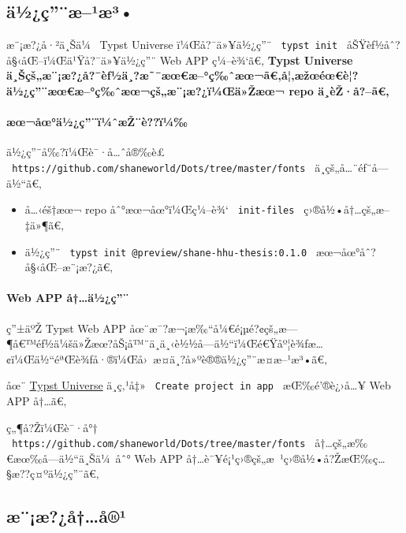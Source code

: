 
\subsection{ä½¿ç''¨æ--¹æ³•}\label{uxe4uxbduxe7uxe6uxb9uxe6uxb3}

æ¨¡æ?¿å·²ä¸Šä¼~ Typst Universe ï¼Œå?¯ä»¥ä½¿ç''¨ \texttt{\ typst\ init\ }
åŠŸèƒ½åˆ?å§‹åŒ--ï¼Œä¹Ÿå?¯ä»¥ä½¿ç''¨ Web APP ç¼--è¾`ã€‚ \textbf{Typst
Universe
ä¸Šçš„æ¨¡æ?¿å?¯èƒ½ä¸?æ˜¯æœ€æ--°ç‰ˆæœ¬ã€‚å¦‚æžœéœ€è¦?ä½¿ç''¨æœ€æ--°ç‰ˆæœ¬çš„æ¨¡æ?¿ï¼Œä»Žæœ¬
repo ä¸­èŽ·å?--ã€‚}

\paragraph{æœ¬åœ°ä½¿ç''¨ï¼ˆæŽ¨è??ï¼‰}\label{uxe6ux153uxe5ux153uxe4uxbduxe7uxefuxbcux2c6uxe6ux17euxe8uxefuxbc}

ä½¿ç''¨å‰?ï¼Œè¯·å\ldots ˆå®‰è£
\texttt{\ https://github.com/shaneworld/Dots/tree/master/fonts\ }
ä¸­çš„å\ldots¨éƒ¨å­---ä½``ã€‚

\begin{itemize}
\item
  å\ldots‹éš†æœ¬ repo åˆ°æœ¬åœ°ï¼Œç¼--è¾` \texttt{\ init-files\ }
  ç›®å½•å†\ldots çš„æ--‡ä»¶ã€‚
\item
  ä½¿ç''¨ \texttt{\ typst\ init\ @preview/shane-hhu-thesis:0.1.0\ }
  æœ¬åœ°åˆ?å§‹åŒ--æ¨¡æ?¿ã€‚
\end{itemize}

\paragraph{Web APP å†\ldots ä½¿ç''¨}\label{web-app-uxe5uxe4uxbduxe7}

ç''±äºŽ Typst Web APP
åœ¨æ¯?æ¬¡æ‰``å¼€é¡µé?¢çš„æ---¶å€™éƒ½ä¼šä»Žæœ?åŠ¡å™¨ä¸­ä¸‹è½½å­---ä½``ï¼Œé€Ÿåº¦è¾ƒæ\ldots¢ï¼Œä½``éªŒè¾ƒå·®ï¼Œå›~æ­¤ä¸?å»ºè®®ä½¿ç''¨æ­¤æ--¹æ³•ã€‚

åœ¨ \href{https://typst.app/universe/package/shane-hhu-thesis}{Typst
Universe} ä¸­ç‚¹å‡» \texttt{\ Create\ project\ in\ app\ }
æŒ‰é'®è¿›å\ldots¥ Web APP å†\ldots ã€‚

ç„¶å?Žï¼Œè¯·å°†
\texttt{\ https://github.com/shaneworld/Dots/tree/master/fonts\ }
å†\ldots çš„æ‰€æœ‰å­---ä½``ä¸Šä¼~åˆ° Web APP
å†\ldots è¯¥é¡¹ç›®çš„æ~¹ç›®å½•å?ŽæŒ‰ç\ldots§æ??ç¤ºä½¿ç''¨ã€‚

\subsection{æ¨¡æ?¿å†\ldots å®¹}\label{uxe6uxe6uxe5uxe5uxb9}

